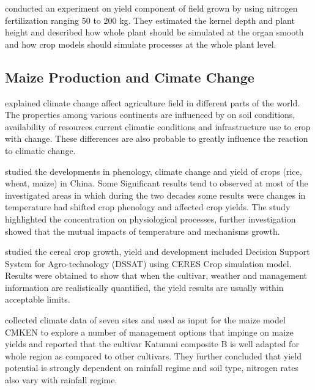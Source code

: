   \citet{Ogunlela1988} conducted an experiment on yield component of field grown by using nitrogen fertilization ranging 50 to 200 kg. They estimated the kernel depth and plant height and described how whole plant should be simulated at the organ smooth and how crop models should simulate processes at the whole plant level.
\subsection{Maize Production and Cimate Change}
  \citet{Parry2000} explained climate change affect agriculture field in different parts of the world. The properties among various continents are influenced by on soil conditions, availability of resources current climatic conditions and infrastructure use to crop with change. These differences are also probable to greatly influence the reaction to climatic change.     

 \citet{Tao2006} studied the developments in phenology, climate change and yield of crops (rice, wheat, maize) in China. Some Significant results tend to observed at most of the investigated areas in which during the two decades some results were changes in temperature had shifted crop phenology and affected crop yields. The study highlighted the concentration on physiological processes, further investigation showed that the mutual impacts of temperature and mechanisms growth.  

 \citet{Ritchie1998} studied the cereal crop growth, yield and development included Decision Support System for Agro-technology (DSSAT) using CERES Crop simulation model. Results were obtained to show that when the cultivar, weather and management information are realistically quantified, the yield results are usually within acceptable limits.

 \citet{Probert2001} collected climate data of seven sites and used as input for the maize model CMKEN to explore a number of management options that impinge on maize yields and reported that the cultivar Katumni composite B is well adapted for whole region as compared to other cultivars. They further concluded that yield potential is strongly dependent on rainfall regime and soil type, nitrogen rates also vary with rainfall regime.

